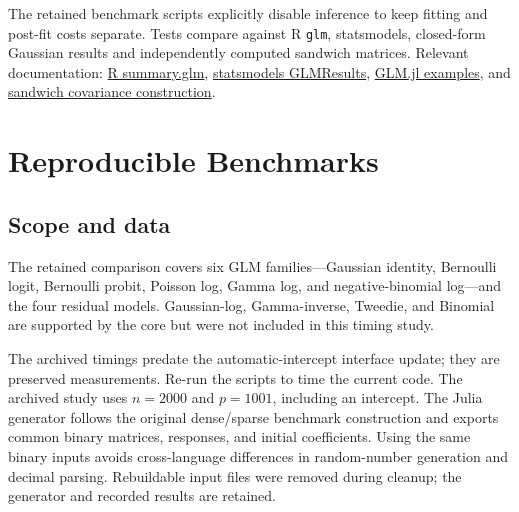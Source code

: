 \documentclass[11pt,a4paper]{article}
\newcommand{\code}[1]{\texttt{#1}}
\begin{document}
The retained benchmark scripts explicitly disable inference to keep fitting
and post-fit costs separate. Tests compare against R \code{glm}, statsmodels,
closed-form Gaussian results and independently computed sandwich matrices.
Relevant documentation: \href{https://stat.ethz.ch/R-manual/R-devel/library/stats/html/summary.glm.html}{R summary.glm},
\href{https://www.statsmodels.org/stable/generated/statsmodels.genmod.generalized_linear_model.GLMResults.html}{statsmodels GLMResults},
\href{https://juliastats.org/GLM.jl/latest/examples/}{GLM.jl examples}, and
\href{https://sandwich.r-forge.r-project.org/reference/sandwich.html}{sandwich covariance construction}.

\section{Reproducible Benchmarks}\label{sec:benchmark}
\subsection{Scope and data}
The retained comparison covers six GLM families---Gaussian identity,
Bernoulli logit, Bernoulli probit, Poisson log, Gamma log, and negative-binomial
log---and the four residual models. Gaussian-log, Gamma-inverse, Tweedie, and
Binomial are supported by the core but were not included in this timing study.

The archived timings predate the automatic-intercept interface update; they
are preserved measurements. Re-run the scripts to time the current code.
The archived study uses $n=2000$ and $p=1001$, including an intercept.
The Julia generator follows the original dense/sparse benchmark construction
and exports common binary matrices, responses, and initial coefficients.
Using the same binary inputs avoids cross-language differences in random-number
generation and decimal parsing. Rebuildable input files were removed during
cleanup; the generator and recorded results are retained.
\end{document}
